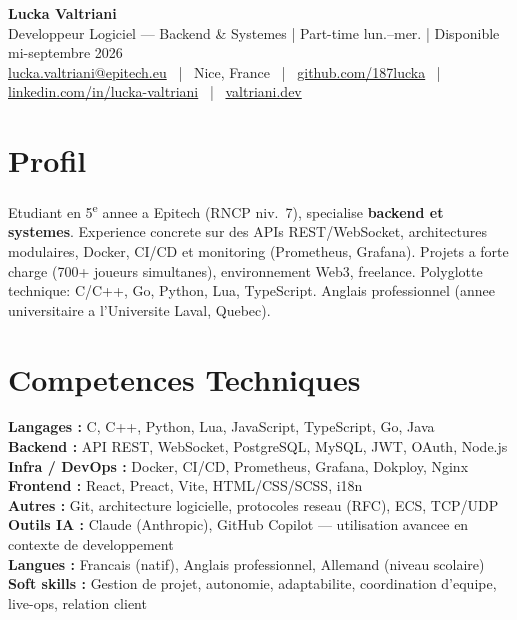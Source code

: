 \documentclass[9pt,a4paper]{article}
\newcommand{\myphone}{}
\begin{document}
\begin{center}
  {\Large\bfseries\color{accent} Lucka Valtriani}\\[3pt]
  {\small\color{gray} Developpeur Logiciel --- Backend \& Systemes | Part-time lun.--mer. | Disponible mi-septembre 2026}\\[4pt]
  {\footnotesize
    \myphone\href{mailto:lucka.valtriani@epitech.eu}{lucka.valtriani@epitech.eu}
    ~|~ Nice, France
    ~|~ \href{https://github.com/187lucka}{github.com/187lucka}
    ~|~ \href{https://www.linkedin.com/in/lucka-valtriani-8a8551258/}{linkedin.com/in/lucka-valtriani}
    ~|~ \href{https://valtriani.dev}{valtriani.dev}
  }
\end{center}

\vspace{3pt}

\section{Profil}
{\small Etudiant en 5\textsuperscript{e} annee a Epitech (RNCP niv.~7), specialise \textbf{backend et systemes}. Experience concrete sur des APIs REST/WebSocket, architectures modulaires, Docker, CI/CD et monitoring (Prometheus, Grafana). Projets a forte charge (700+ joueurs simultanes), environnement Web3, freelance. Polyglotte technique: C/C++, Go, Python, Lua, TypeScript. Anglais professionnel (annee universitaire a l'Universite Laval, Quebec).}

\vspace{0pt}

\section{Competences Techniques}
{\small
\noindent\textbf{Langages :} C, C++, Python, Lua, JavaScript, TypeScript, Go, Java\\[2pt]
\noindent\textbf{Backend :} API REST, WebSocket, PostgreSQL, MySQL, JWT, OAuth, Node.js\\[2pt]
\noindent\textbf{Infra / DevOps :} Docker, CI/CD, Prometheus, Grafana, Dokploy, Nginx\\[2pt]
\noindent\textbf{Frontend :} React, Preact, Vite, HTML/CSS/SCSS, i18n\\[2pt]
\noindent\textbf{Autres :} Git, architecture logicielle, protocoles reseau (RFC), ECS, TCP/UDP\\[2pt]
\noindent\textbf{Outils IA :} Claude (Anthropic), GitHub Copilot --- utilisation avancee en contexte de developpement\\[2pt]
\noindent\textbf{Langues :} Francais (natif), Anglais professionnel, Allemand (niveau scolaire)\\[2pt]
\noindent\textbf{Soft skills :} Gestion de projet, autonomie, adaptabilite, coordination d'equipe, live-ops, relation client
}
\end{document}
